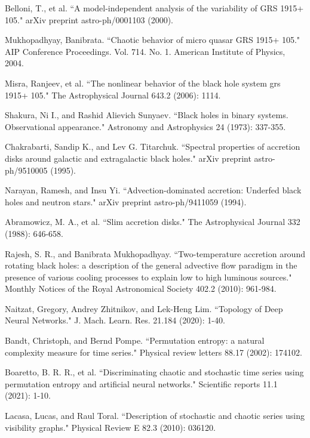 \documentclass[10pt,conference]{IEEEtran}
\begin{document}
\begin{thebibliography}{1}

Belloni, T., et al. ``A model-independent analysis of the variability of GRS 1915+ 105." arXiv preprint astro-ph/0001103 (2000).

Mukhopadhyay, Banibrata. ``Chaotic behavior of micro quasar GRS 1915+ 105." AIP Conference Proceedings. Vol. 714. No. 1. American Institute of Physics, 2004.

Misra, Ranjeev, et al. ``The nonlinear behavior of the black hole system grs 1915+ 105." The Astrophysical Journal 643.2 (2006): 1114.

Shakura, Ni I., and Rashid Alievich Sunyaev. ``Black holes in binary systems. Observational appearance." Astronomy and Astrophysics 24 (1973): 337-355.

Chakrabarti, Sandip K., and Lev G. Titarchuk. ``Spectral properties of accretion disks around galactic and extragalactic black holes." arXiv preprint astro-ph/9510005 (1995).

 Narayan, Ramesh, and Insu Yi. ``Advection-dominated accretion: Underfed black holes and neutron stars." arXiv preprint astro-ph/9411059 (1994).

Abramowicz, M. A., et al. ``Slim accretion disks." The Astrophysical Journal 332 (1988): 646-658.

Rajesh, S. R., and Banibrata Mukhopadhyay. ``Two-temperature accretion around rotating black holes: a description of the general advective flow paradigm in the presence of various cooling processes to explain low to high luminous sources." Monthly Notices of the Royal Astronomical Society 402.2 (2010): 961-984.

Naitzat, Gregory, Andrey Zhitnikov, and Lek-Heng Lim. ``Topology of Deep Neural Networks." J. Mach. Learn. Res. 21.184 (2020): 1-40.

Bandt, Christoph, and Bernd Pompe. ``Permutation entropy: a natural complexity measure for time series." Physical review letters 88.17 (2002): 174102.

Boaretto, B. R. R., et al. ``Discriminating chaotic and stochastic time series using permutation entropy and artificial neural networks." Scientific reports 11.1 (2021): 1-10.

 Lacasa, Lucas, and Raul Toral. ``Description of stochastic and chaotic series using visibility graphs." Physical Review E 82.3 (2010): 036120.


\end{thebibliography}
\end{document}
